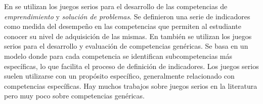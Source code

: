En \cite{guenaga2013serious} se utilizan los juegos serios para el desarrollo de las competencias de \emph{emprendimiento} y \emph{solución de problemas}. Se definieron una serie de indicadores como medida del desempeño en las competencias que permiten al estudiante conocer su nivel de adquisición de las mismas. En \cite{bedek2011behavioral} también se utilizan los juegos serios para el desarrollo y evaluación de competencias genéricas. Se basa en un modelo donde para cada competencia se identifican subcompetencias más específicas, lo que facilita el proceso de definición de indicadores. Los juegos serios suelen utilizarse con un propósito específico, generalmente relacionado con competencias específicas. Hay muchos trabajos sobre juegos serios en la literatura pero muy poco sobre competencias genéricas. 




